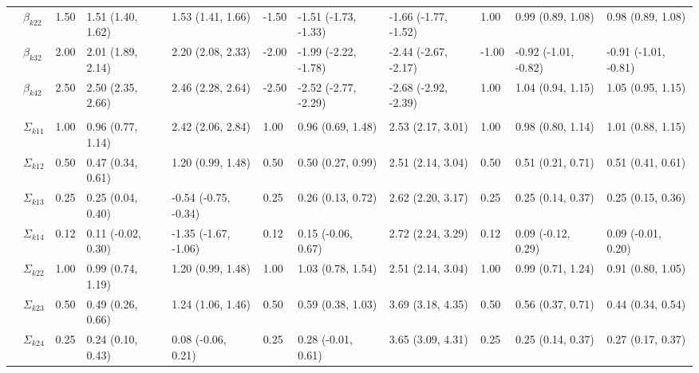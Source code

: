 \documentclass[useAMS,11pt]{article}
\newcommand{\1}{\mathbbm{1}}
\begin{document}
\begin{landscape}
\begin{table}[t]
\begin{center}
\begin{tabular}{lllllllllll}
\hspace{1em} & $\beta_{k22}$ & 1.50 & 1.51 (1.40, 1.62) & 1.53 (1.41, 1.66) & -1.50 & -1.51 (-1.73, -1.33) & -1.66 (-1.77, -1.52) & 1.00 & 0.99 (0.89, 1.08) & 0.98 (0.89, 1.08)\\
\hspace{1em} & $\beta_{k32}$ & 2.00 & 2.01 (1.89, 2.14) & 2.20 (2.08, 2.33) & -2.00 & -1.99 (-2.22, -1.78) & -2.44 (-2.67, -2.17) & -1.00 & -0.92 (-1.01, -0.82) & -0.91 (-1.01, -0.81)\\
\hspace{1em} & $\beta_{k42}$ & 2.50 & 2.50 (2.35, 2.66) & 2.46 (2.28, 2.64) & -2.50 & -2.52 (-2.77, -2.29) & -2.68 (-2.92, -2.39) & 1.00 & 1.04 (0.94, 1.15) & 1.05 (0.95, 1.15)\\
\addlinespace[0.3em]
\multicolumn{11}{l}{\textbf{ }}\\
\hspace{1em} & $\Sigma_{k11}$ & 1.00 & 0.96 (0.77, 1.14) & 2.42 (2.06, 2.84)& 1.00 & 0.96 (0.69, 1.48) & 2.53 (2.17, 3.01) & 1.00 & 0.98 (0.80, 1.14) & 1.01 (0.88, 1.15)\\
\hspace{1em} & $\Sigma_{k12}$ & 0.50 & 0.47 (0.34, 0.61) & 1.20 (0.99, 1.48) & 0.50 & 0.50 (0.27, 0.99) & 2.51 (2.14, 3.04) & 0.50 & 0.51 (0.21, 0.71) & 0.51 (0.41, 0.61)\\
\hspace{1em} & $\Sigma_{k13}$ & 0.25 & 0.25 (0.04, 0.40) & -0.54 (-0.75, -0.34) & 0.25 & 0.26 (0.13, 0.72) & 2.62 (2.20, 3.17) & 0.25 & 0.25 (0.14, 0.37) & 0.25 (0.15, 0.36)\\
\hspace{1em} & $\Sigma_{k14}$ & 0.12 & 0.11 (-0.02, 0.30) & -1.35 (-1.67, -1.06) & 0.12 & 0.15 (-0.06, 0.67) & 2.72 (2.24, 3.29) & 0.12 & 0.09 (-0.12, 0.29) & 0.09 (-0.01, 0.20)\\
\hspace{1em} & $\Sigma_{k22}$ & 1.00 & 0.99 (0.74, 1.19) & 1.20 (0.99, 1.48) & 1.00 & 1.03 (0.78, 1.54) & 2.51 (2.14, 3.04) & 1.00 & 0.99 (0.71, 1.24)& 0.91 (0.80, 1.05)\\
\hspace{1em} & $\Sigma_{k23}$ & 0.50 & 0.49 (0.26, 0.66) & 1.24 (1.06, 1.46) & 0.50 & 0.59 (0.38, 1.03) & 3.69 (3.18, 4.35) & 0.50 & 0.56 (0.37, 0.71) & 0.44 (0.34, 0.54)\\
\hspace{1em} & $\Sigma_{k24}$ & 0.25 & 0.24 (0.10, 0.43) & 0.08 (-0.06, 0.21) & 0.25 & 0.28 (-0.01, 0.61) & 3.65 (3.09, 4.31) & 0.25 & 0.25 (0.14, 0.37) & 0.27 (0.17, 0.37)\\

\end{tabular}
\end{center}
\end{table}
\end{landscape}
\end{document}
